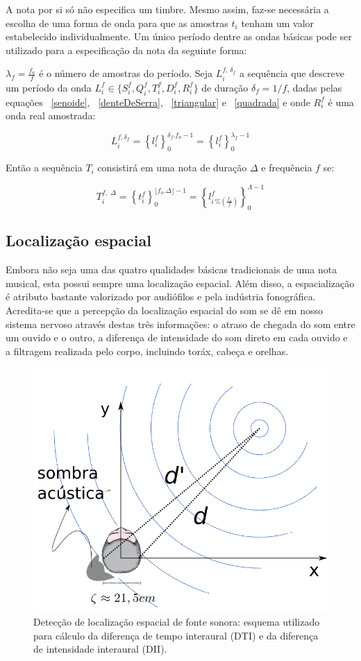A nota por si só não especifica um timbre. Mesmo assim, faz-se necessária a escolha de uma forma de onda para que as amostras $t_i$ tenham um valor estabelecido individualmente. Um único período dentre as ondas básicas pode ser utilizado para a especificação da nota da seguinte forma:

$\lambda_f=\frac{f_a}{f}$ é o número de amostras do período. Seja $L_i^{f,\, \delta_f} $
a sequência que descreve um período da onda $L_i^f \in \{S_i^f,Q_i^f,T_i^f,D_i^f,R_i^f \}$ de duração 
$\delta_f=1/f$, dadas pelas equações ~\ref{senoide}, ~\ref{denteDeSerra}, ~\ref{triangular} e ~\ref{quadrada} e onde $R_i^f$ é
uma onda real amostrada:

\begin{equation}\label{periodoUnico}
L_i^{f , \delta_f } = \left\{ l_i^f \right\}_0^{\delta_f . f_a -1}=\left\{ l_i^f \right\}_0^{\lambda_f-1}
\end{equation}

Então a sequência $T_i$ consistirá em uma nota de duração $\Delta$ e frequência $f$ se:

\begin{equation}
T_i^{f,\; \Delta}=\left\{t_i^f\right\}_0^{\lfloor f_a . \Delta \rfloor -1}=\left \{ l^f_{i\,\%\left(\frac{f_a}{f}\right)} \right \}_0^{\Lambda-1}
\end{equation}

\subsection{Localização espacial}
Embora não seja uma das quatro qualidades básicas tradicionais de uma nota musical, esta possui sempre uma localização espacial. Além disso, a espacialização é atributo bastante valorizado
 por audiófilos e pela indústria fonográfica.\cite{floEsp}
Acredita-se que a percepção da localização espacial do som se dê em nosso sistema nervoso através destas
três informações: o atraso de chegada do som entre um ouvido e o outro, a diferença de intensidade do som direto em cada ouvido e a 
filtragem realizada pelo corpo, incluindo toráx, cabeça e orelhas.\cite{Roederer, hrtf, Heeger}


\begin{figure}[h!]
    \centering
        \includegraphics[width=.5\textwidth]{figuras/espacializacao___}
    \caption{Detecção de localização espacial de fonte sonora: esquema utilizado para cálculo da diferença de tempo interaural (DTI) e da diferença de intensidade interaural (DII).}
        \label{fig:spac}
\end{figure}



